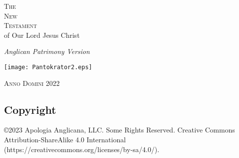 \documentclass[twocolumn,twoside,titlepage,10pt]{book}\usepackage[paperheight=210mm,paperwidth=148mm,inner=25.4mm,outer=20mm,top=15mm,bottom=15mm,heightrounded]{geometry}
\begin{document}
	\begin{titlepage}
		\begin{center}
			\vspace*{2cm}
			\par
			{
			\textsc{
			\LARGE{The}\\
			\vspace{1ex}
			\Huge{New}\\
			\vspace{1.5ex}
			\huge{Testament}
			}\\
			\vspace{2ex}
			\Large{of Our Lord Jesus Christ}
			\par
			\vspace{.5cm}
			\large{\textit{Anglican Patrimony Version}}
			}
			\par
			\vspace{1cm}
			\par
			\texttt{[image: Pantokrator2.eps]}
			\par
			\vspace{1cm}
			\textsc{Anno Domini 2022}
		\end{center}
	\end{titlepage}
    \begin{onecolumn}
	\chapter{Copyright}
	\copyright 2023 Apologia Anglicana, LLC. Some Rights Reserved. Creative Commons Attribution-ShareAlike 4.0 International (https://creativecommons.org/licenses/by-sa/4.0/).
	\end{onecolumn}
\end{document}
